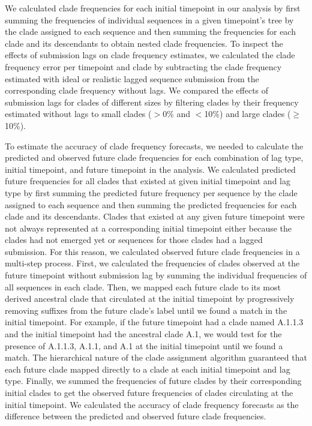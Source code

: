 \documentclass[9pt,lineno]{elife}
\begin{document}
We calculated clade frequencies for each initial timepoint in our analysis by first summing the frequencies of individual sequences in a given timepoint's tree by the clade assigned to each sequence and then summing the frequencies for each clade and its descendants to obtain nested clade frequencies.
To inspect the effects of submission lags on clade frequency estimates, we calculated the clade frequency error per timepoint and clade by subtracting the clade frequency estimated with ideal or realistic lagged sequence submission from the corresponding clade frequency without lags.
We compared the effects of submission lags for clades of different sizes by filtering clades by their frequency estimated without lags to small clades ($>$0\% and $<$10\%) and large clades ($\ge$10\%).

To estimate the accuracy of clade frequency forecasts, we needed to calculate the predicted and observed future clade frequencies for each combination of lag type, initial timepoint, and future timepoint in the analysis.
We calculated predicted future frequencies for all clades that existed at given initial timepoint and lag type by first summing the predicted future frequency per sequence by the clade assigned to each sequence and then summing the predicted frequencies for each clade and its descendants.
Clades that existed at any given future timepoint were not always represented at a corresponding initial timepoint either because the clades had not emerged yet or sequences for those clades had a lagged submission.
For this reason, we calculated observed future clade frequencies in a multi-step process.
First, we calculated the frequencies of clades observed at the future timepoint without submission lag by summing the individual frequencies of all sequences in each clade.
Then, we mapped each future clade to its most derived ancestral clade that circulated at the initial timepoint by progressively removing suffixes from the future clade's label until we found a match in the initial timepoint.
For example, if the future timepoint had a clade named A.1.1.3 and the initial timepoint had the ancestral clade A.1, we would test for the presence of A.1.1.3, A.1.1, and A.1 at the initial timepoint until we found a match.
The hierarchical nature of the clade assignment algorithm guaranteed that each future clade mapped directly to a clade at each initial timepoint and lag type.
Finally, we summed the frequencies of future clades by their corresponding initial clades to get the observed future frequencies of clades circulating at the initial timepoint.
We calculated the accuracy of clade frequency forecasts as the difference between the predicted and observed future clade frequencies.
\end{document}
